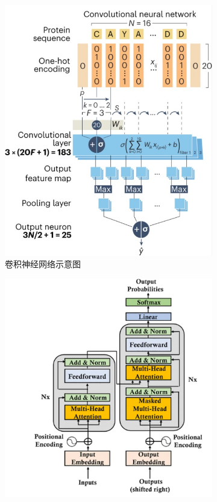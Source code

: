 \documentclass[UTF8,openany,zihao=5]{ctexbook}
\begin{document}
\begin{figure}[h]
    \centering
    \begin{subfigure}[b]{0.40\textwidth}
        \includegraphics[width=\textwidth]{images/cnn.jpg}
        \caption{卷积神经网络示意图\cite{lecun2002gradient}}
        \label{fig:subimaga}
    \end{subfigure}
    \hfill
    \begin{subfigure}[b]{0.45\textwidth}
        \includegraphics[width=\textwidth]{images/transformer.jpg}

\end{subfigure}
\end{figure}
\end{document}
